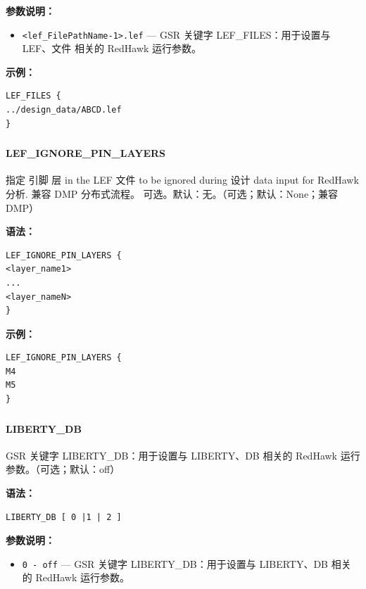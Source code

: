 \textbf{参数说明：}
\begin{itemize}
\item \texttt{<lef\_FilePathName-1>.lef} — GSR 关键字 LEF\_FILES：用于设置与 LEF、文件 相关的 RedHawk 运行参数。
\end{itemize}

\textbf{示例：}
\begin{lstlisting}
LEF_FILES {
../design_data/ABCD.lef
}
\end{lstlisting}

\subsubsection{}
\paragraph*{LEF_IGNORE_PIN_LAYERS}

指定 引脚 层 in the LEF 文件 to be ignored during 设计 data input for RedHawk 分析. 兼容 DMP 分布式流程。 可选。默认：无。（可选；默认：None；兼容 DMP）

\textbf{语法：}
\begin{lstlisting}
LEF_IGNORE_PIN_LAYERS {
<layer_name1>
...
<layer_nameN>
}
\end{lstlisting}

\textbf{示例：}
\begin{lstlisting}
LEF_IGNORE_PIN_LAYERS {
M4
M5
}
\end{lstlisting}

\subsubsection{}
\paragraph*{LIBERTY_DB}

GSR 关键字 LIBERTY_DB：用于设置与 LIBERTY、DB 相关的 RedHawk 运行参数。（可选；默认：off）

\textbf{语法：}
\begin{lstlisting}
LIBERTY_DB [ 0 |1 | 2 ]
\end{lstlisting}

\textbf{参数说明：}
\begin{itemize}
\item \texttt{0 - off} — GSR 关键字 LIBERTY\_DB：用于设置与 LIBERTY、DB 相关的 RedHawk 运行参数。
\end{itemize}

